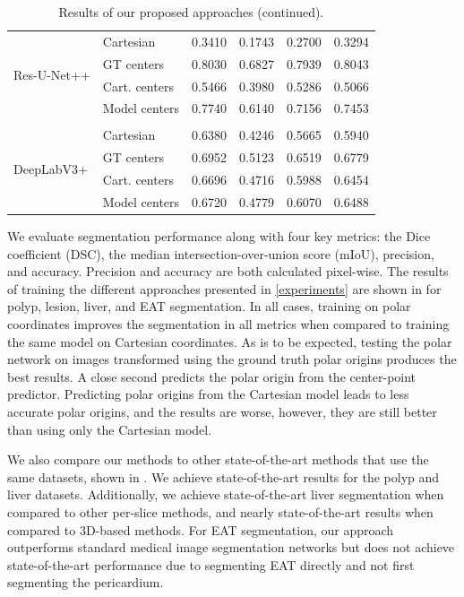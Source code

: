 \begin{table}
\begin{tabularx}{\textwidth}{X X c c c c}
 \multirow{4}{7em}{{Res-U-Net++}}
& Cartesian & 0.3410 & 0.1743 & 0.2700 & 0.3294 \\
& GT centers & 0.8030 & 0.6827 & 0.7939 & 0.8043 \\
& Cart. centers & 0.5466 & 0.3980 & 0.5286 & 0.5066 \\
& Model centers & 0.7740 & 0.6140 & 0.7156 & 0.7453 \\ [1ex]
\hline \\ [-1.5ex]

 \multirow{4}{7em}{{DeepLabV3+}}
& Cartesian & 0.6380 & 0.4246 & 0.5665 & 0.5940 \\
& GT centers & 0.6952 & 0.5123 & 0.6519 & 0.6779 \\
& Cart. centers & 0.6696 & 0.4716 & 0.5988 & 0.6454 \\
& Model centers & 0.6720 & 0.4779 & 0.6070 & 0.6488 \\ [1ex]
\end{tabularx}
\caption{Results of our proposed approaches (continued).}
\label{table:results}
\end{table}

We evaluate segmentation performance along with four key metrics: the Dice coefficient (DSC), the median intersection-over-union score (mIoU), precision, and accuracy. Precision and accuracy are both calculated pixel-wise. The results of training the different approaches presented in \ref{experiments} are shown in  for polyp, lesion, liver, and EAT segmentation. In all cases, training on polar coordinates improves the segmentation in all metrics when compared to training the same model on Cartesian coordinates. As is to be expected, testing the polar network on images transformed using the ground truth polar origins produces the best results. A close second predicts the polar origin from the center-point predictor. Predicting polar origins from the Cartesian model leads to less accurate polar origins, and the results are worse, however, they are still better than using only the Cartesian model.

We also compare our methods to other state-of-the-art methods that use the same datasets, shown in . We achieve state-of-the-art results for the polyp and liver datasets. Additionally, we achieve state-of-the-art liver segmentation when compared to other per-slice methods, and nearly state-of-the-art results when compared to 3D-based methods. For EAT segmentation, our approach outperforms standard medical image segmentation networks but does not achieve state-of-the-art performance due to segmenting EAT directly and not first segmenting the pericardium.


